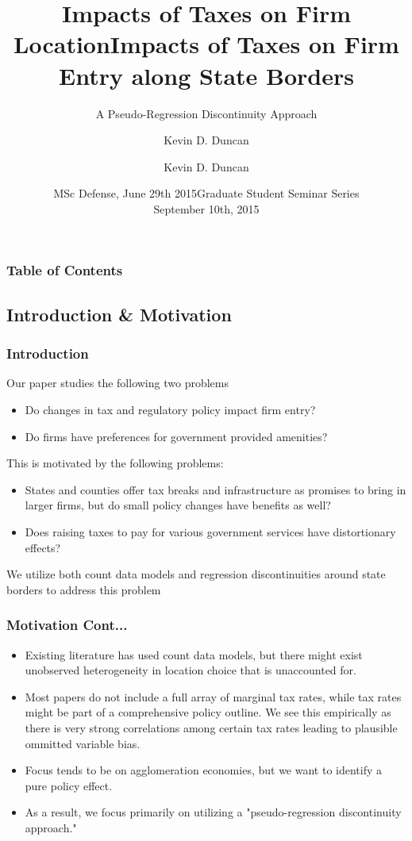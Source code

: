 \documentclass{beamer}
\title{Impacts of Taxes on Firm Location}
\author{Kevin D. Duncan}
\institute{Iowa State University}
\date{MSc Defense, June 29th 2015}
\begin{document}
\begin{frame}
\title{Impacts of Taxes on Firm Entry along State Borders}
\subtitle{A Pseudo-Regression Discontinuity Approach}
\author{Kevin D. Duncan}
\date{Graduate Student Seminar Series \\ September 10th, 2015}
\maketitle
\end{frame}

\begin{frame}
\frametitle{Table of Contents}
\tableofcontents
\end{frame}

\begin{frame}
\section{Introduction \& Motivation}
\frametitle{Introduction}
Our paper studies the following two problems
\begin{itemize}
\item Do changes in tax and regulatory policy impact firm entry?
\item Do firms have preferences for government provided amenities?
\end{itemize}
                        
This is motivated by the following problems:
\begin{itemize}
\item States and counties offer tax breaks and infrastructure as promises to bring in larger firms, but do small policy changes have benefits as well?
\item Does raising taxes to pay for various government services have distortionary effects?
\end{itemize}
We utilize both count data models and regression discontinuities around state borders to address this problem
\end{frame}

\begin{frame}
\frametitle{Motivation Cont...}
\begin{itemize}
\item Existing literature has used count data models, but there might exist unobserved heterogeneity in location choice that is unaccounted for.
\item Most papers do not include a full array of marginal tax rates, while tax rates might be part of a comprehensive policy outline. We see this empirically as there is very strong correlations among certain tax rates leading to plausible ommitted variable bias.
\item Focus tends to be on agglomeration economies, but we want to identify a pure policy effect.
\item As a result, we focus primarily on utilizing a "pseudo-regression discontinuity approach."
\end{itemize}
\end{frame}
\end{document}
